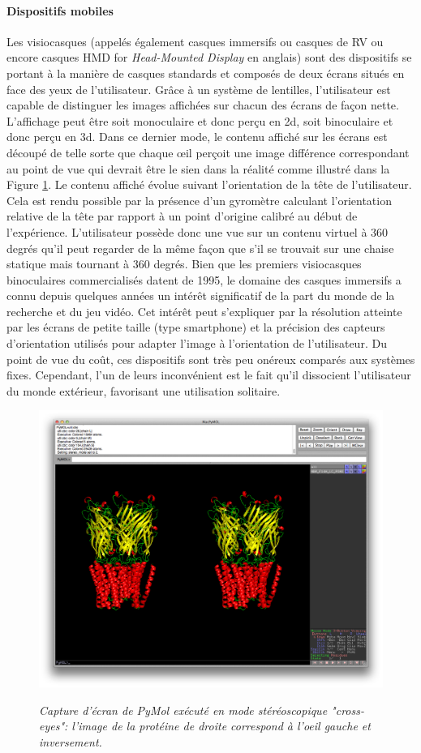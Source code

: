 \paragraph{Dispositifs mobiles} \label{dispo_mobil}

Les visiocasques (appelés également casques immersifs ou casques de RV ou encore casques HMD for \textit{Head-Mounted Display} en anglais) sont des dispositifs se portant à la manière de casques standards et composés de deux écrans situés en face des yeux de l'utilisateur. Grâce à un système de lentilles, l'utilisateur est capable de distinguer les images affichées sur chacun des écrans de façon nette. L'affichage peut être soit monoculaire et donc perçu en 2d, soit binoculaire et donc perçu en 3d. Dans ce dernier mode, le contenu affiché sur les écrans est découpé de telle sorte que chaque œil perçoit une image différence correspondant au point de vue qui devrait être le sien dans la réalité comme illustré dans la Figure \ref{Fig:pymol_stereo}. Le contenu affiché évolue suivant l'orientation de la tête de l'utilisateur. Cela est rendu possible par la présence d'un gyromètre calculant l'orientation relative de la tête par rapport à un point d'origine calibré au début de l'expérience. L'utilisateur possède donc une vue sur un contenu virtuel à 360 degrés qu'il peut regarder de la même façon que s'il se trouvait sur une chaise statique mais tournant à 360 degrés. Bien que les premiers visiocasques binoculaires commercialisés datent de 1995, le domaine des casques immersifs a connu depuis quelques années un intérêt significatif de la part du monde de la recherche et du jeu vidéo. Cet intérêt peut s'expliquer par la résolution atteinte par les écrans de petite taille (type smartphone) et la précision des capteurs d'orientation utilisés pour adapter l'image à l'orientation de l'utilisateur. Du point de vue du coût, ces dispositifs sont très peu onéreux comparés aux systèmes fixes. Cependant, l'un de leurs inconvénient est le fait qu'il dissocient l'utilisateur du monde extérieur, favorisant une utilisation solitaire.

\begin{figure}
  \centering
  {\includegraphics[width=.75\linewidth]{./figures/ch2/pymol_stereo}}
    \caption{{\it Capture d'écran de PyMol exécuté en mode stéréoscopique "cross-eyes": l'image de la protéine de droite correspond à l'oeil gauche et inversement.}}
  \label{Fig:pymol_stereo}
  \hspace{0.3cm}
\end{figure}

